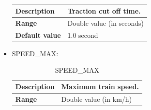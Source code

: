 \documentclass{template/openetcs}
\begin{document}
\begin{itemize}
\begin{longtable}{|l|l|}
					\begin{minipage}[t]{0.22\linewidth} \textbf{Description}	\end{minipage} 
				&	\begin{minipage}[t]{0.78\linewidth} Traction cut off time. \end{minipage} \\
				
				\hline
																																									
					\begin{minipage}[t]{0.22\linewidth} \textbf{Range}	\end{minipage} 
				&	\begin{minipage}[t]{0.78\linewidth} Double value (in seconds) \end{minipage} \\
				
				\hline
				
					\begin{minipage}[t]{0.22\linewidth} \textbf{Default value}	\end{minipage} 
				&	\begin{minipage}[t]{0.78\linewidth} 1.0 second \end{minipage} \\
				
				\hline
				
			\end{longtable}
			
		\item SPEED\_MAX:
																							
			\begin{longtable}{|l|l|}
				\caption{SPEED\_MAX}\\ 
				\hline
				
					\begin{minipage}[t]{0.22\linewidth} \textbf{Description}	\end{minipage} 
				&	\begin{minipage}[t]{0.78\linewidth} Maximum train speed. \end{minipage} \\
				
				\hline
																																									
					\begin{minipage}[t]{0.22\linewidth} \textbf{Range}	\end{minipage} 
				&	\begin{minipage}[t]{0.78\linewidth} Double value (in km/h) \end{minipage} \\
				

\end{longtable}
\end{itemize}
\end{document}
